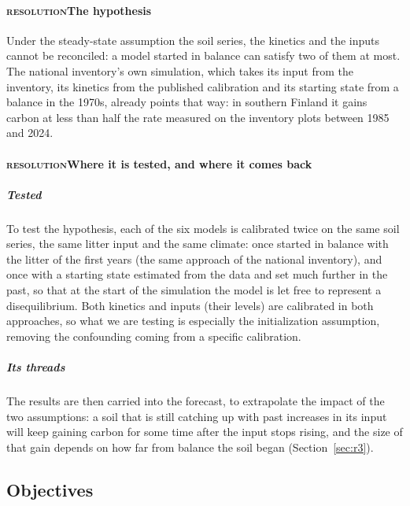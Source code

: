 \documentclass[11pt]{article}
\newcommand{\beat}[1]{\textcolor{black!45}{\textsc{\small #1}}\enspace}
\begin{document}
\paragraph{\beat{resolution}The hypothesis}
Under the steady-state assumption the soil series, the kinetics and the inputs cannot be
reconciled: a model started in balance can satisfy two of them at most. The national inventory's
own simulation, which takes its input from the inventory, its kinetics from the published
calibration and its starting state from a balance in the 1970s, already points that way: in
southern Finland it gains carbon at less than half the rate measured on the inventory plots
between 1985 and 2024.


\paragraph{\beat{resolution}Where it is tested, and where it comes back}
\subparagraph{Tested}
To test the hypothesis, each of the six models is calibrated twice on the same soil series, the same litter input and the same climate:
once started in balance with the litter of the first years (the same approach of the national inventory), and once with a starting state estimated from the data and set much further in the past, so that at the start of the simulation the model is let free to represent a disequilibrium.
Both kinetics and inputs (their levels) are calibrated in both approaches, so what we are testing is especially the initialization assumption, removing the confounding coming from a specific calibration.

\subparagraph{Its threads}
The results are then carried into the forecast, to extrapolate the impact of the two assumptions: a soil
that is still catching up with past increases in its input will keep gaining carbon for some time
after the input stops rising, and the size of that gain depends on how far from balance the soil
began (Section~\ref{sec:r3}). 

\subsection{Objectives}
\end{document}
